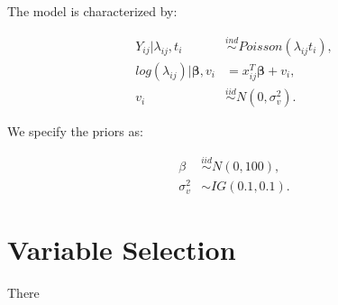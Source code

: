 \documentclass[a4paper]{article}\usepackage[]{graphicx}\usepackage[]{color}
\begin{document}
The model is characterized by:

\begin{align*}
Y_{ij}|\lambda_{ij},t_i &\overset{ind}{\sim} Poisson(\lambda_{ij}t_i),\\
log(\lambda_{ij})|\boldsymbol{\beta},v_i &= x_{ij}^T \boldsymbol{\beta} + v_i, \\
v_i &\overset{iid}{\sim} N(0,\sigma_v^2).
\end{align*}

We specify the priors as:

\begin{align*}
\beta &\overset{iid}{\sim} N(0,100),\\
\sigma_v^2 &\sim IG(0.1,0.1).
\end{align*}


\section{Variable Selection}

There 
\end{document}
